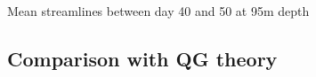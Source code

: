 \documentclass{beamer}
\begin{document}
\begin{frame}{Mean streamlines between day 40 and 50 at 95m depth}

\end{frame}



\subsection{Comparison with QG theory}
\end{document}

